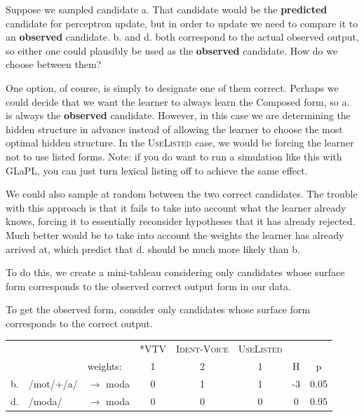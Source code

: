 \documentclass[12]{article}
\begin{document}
	  Suppose we sampled candidate a.  That candidate would be the {\bf predicted} candidate for perceptron update, but in order to update we need to compare it to an {\bf observed} candidate.  b. and d. both correspond to the actual observed output, so either one could plausibly be used as the {\bf observed} candidate.  How do we choose between them?
	  
	  One option, of course, is simply to designate one of them correct.  Perhaps we could decide that we want the learner to always learn the Composed form, so a. is always the {\bf observed} candidate.  However, in this case we are determining the hidden structure in advance instead of allowing the learner to choose the most optimal hidden structure.  In the \textsc{UseListed} case, we would be forcing the learner not to use listed forms.  Note: if you do want to run a simulation like this with GLaPL, you can just turn lexical listing off to achieve the same effect.
	  
	  We could also sample at random between the two correct candidates.  The trouble with this approach is that it fails to take into account what the learner already knows, forcing it to essentially reconsider hypotheses that it has already rejected.  Much better would be to take into account the weights the learner has already arrived at, which predict that d. should be much more likely than b.
	  
	  To do this, we create a mini-tableau considering only candidates whose surface form corresponds to the observed correct output form in our data.
	  
	  \begin{exe}
	  	\ex\label{observedGrabber} To get the observed form, consider only candidates whose surface form corresponds to the correct output.
	  	
	  	\begin{tabular}{lll|ccc|cc}
	  		
	  		& &                  &\textsc{*VTV} & \textsc{Ident-Voice} & \textsc{UseListed} &   &  \\
	  		& &       weights:    &  1  &  2          &   1       & H & p \\  
	  		\hline 
	  		
	  		b.& /mot/+/a/& $\rightarrow$ moda &  0  &  1          &   1       & -3&0.05\\
	  		d.& /moda/   & $\rightarrow$ moda &  0  &  0          &   0       & 0 &0.95\\
	  		
	  	\end{tabular}
	  	
	  \end{exe}
  
\end{document}
